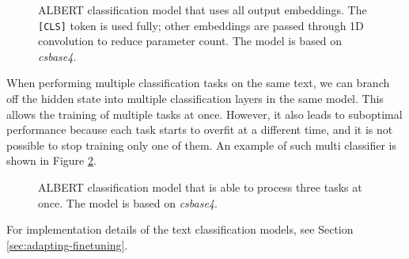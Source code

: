 \documentclass[
  printed, %
  color,   %
  table,   %
  oneside, %
  lof,     %
  lot,     %
]{fithesis3}
\begin{document}
\begin{figure}[h]
    \caption[ALBERT classification model -- use all output embeddings]{
        ALBERT classification model that uses all output embeddings. The \texttt{[CLS]} token is used fully; other embeddings are passed through 1D convolution to reduce parameter count. The model is based on \textit{csbase4}.
    }
    \label{fig:model-class-use-embed}
    \centering
\end{figure}


When performing multiple classification tasks on the same text, we can branch off the hidden state into multiple classification layers in the same model. This allows the training of multiple tasks at once.
However, it also leads to suboptimal performance because each task starts to overfit at a different time, and it is not possible to stop training only one of them. An example of such multi classifier is shown in Figure \ref{fig:model-class-multi}.

\begin{figure}[hbt]
    \caption[ALBERT classification model -- multiple tasks at once]{
        ALBERT classification model that is able to process three tasks at once. The model is based on \textit{csbase4}.
    }
    \label{fig:model-class-multi}
    \centering

\end{figure}

{\parindent=0cm
For implementation details of the text classification models, see Section \ref{sec:adapting-finetuning}.
}
\end{document}
